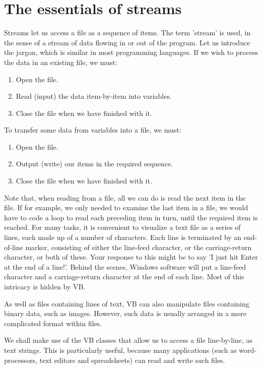 	\section{The essentials of streams}
		Streams let us access a file as a sequence of items. The term 'stream' is used, in the sense of a stream of data flowing in or out of the program. Let us introduce the jargon, which is similar in most programming languages. If we wish to process the data in an existing file, we must:
		\begin{enumerate}
			\item	Open the file.
			\item	Read (input) the data item-by-item into variables.
			\item	Close the file when we have finished with it. 
		\end{enumerate}
		To transfer some data from variables into a file, we must:
		\begin{enumerate}
			\item	Open the file.
			\item	Output (write) our items in the required sequence.
			\item	Close the file when we have finished with it.
		\end{enumerate}
		
		Note that, when reading from a file, all we can do is read the next item in the file. If for example, we only needed to examine the last item in a file, we would have to code a loop to read each preceding item in turn, until the required item is reached. For many tasks, it is convenient to visualize a text file as a series of lines, each made up of a number of characters. Each line is terminated by an end-of-line marker, consisting of either the line-feed character, or the carriage-return character, or both of these. Your response to this might be to say 'I just hit Enter at the end of a line!'. Behind the scenes, Windows software will put a line-feed character and a carriage-return character at the end of each line. Most of this intricacy is hidden by VB.
		
		As well as files containing lines of text, VB can also manipulate files containing binary data, such as images. However, such data is usually arranged in a more complicated format within files.
		
		We shall make use of the VB classes that allow us to access a file line-by-line, as text strings. This is particularly useful, because many applications (such as word-processors, text editors and spreadsheets) can read and write such files.


